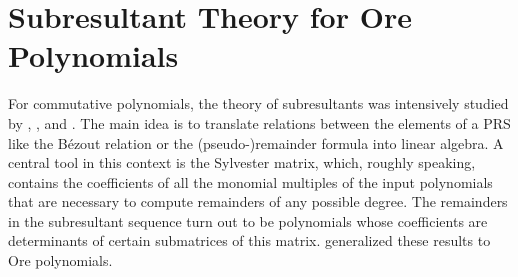 \documentclass[3p,11pt,preprint]{elsarticle}
\begin{document}
\section{Subresultant Theory for Ore Polynomials}
\label{sressec}

For commutative polynomials, the theory of subresultants was intensively studied by \cite{brown}, \cite{browntraub}, \cite{collins} and \cite{loos}. The main idea is to translate relations between the elements of a PRS like the B\'ezout relation or the (pseudo-)remainder formula into linear algebra. A central tool in this context is the Sylvester matrix, which, roughly speaking, contains the coefficients of all the monomial multiples of the input polynomials that are necessary to compute remainders of any possible degree. The remainders in the subresultant sequence turn out to be polynomials whose coefficients are determinants of certain submatrices of this matrix. \cite{zli} generalized these results to Ore polynomials. 
\end{document}
